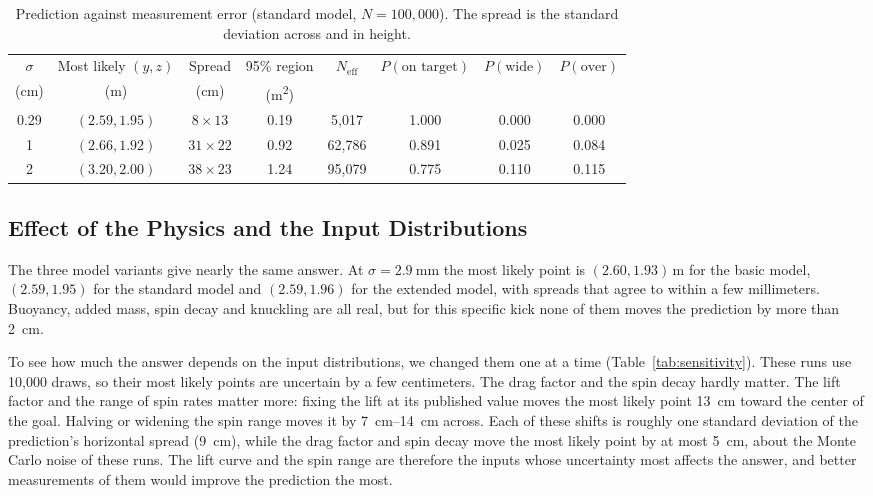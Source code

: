 \documentclass[10pt,a4paper]{article}
\begin{document}
\begin{table}[H]
  \centering
  \caption{Prediction against measurement error (standard model,
    $N = 100{,}000$). The spread is the standard deviation across and in
    height.}
  \label{tab:sigma}
  \small
  \begin{tabular}{cccccccc}
    \toprule
    $\sigma$ & Most likely $(y, z)$ & Spread & 95\% region & $N_{\mathrm{eff}}$
      & $P(\text{on target})$ & $P(\text{wide})$ & $P(\text{over})$ \\
    (\si{\centi\metre}) & (\si{\metre}) & (\si{\centi\metre}) & (\si{\metre\squared}) & & & & \\
    \midrule
    0.29 & $(2.59, 1.95)$ & $8 \times 13$  & 0.19 & 5{,}017  & 1.000 & 0.000 & 0.000 \\
    1    & $(2.66, 1.92)$ & $31 \times 22$ & 0.92 & 62{,}786 & 0.891 & 0.025 & 0.084 \\
    2    & $(3.20, 2.00)$ & $38 \times 23$ & 1.24 & 95{,}079 & 0.775 & 0.110 & 0.115 \\
    \bottomrule
  \end{tabular}
\end{table}

\subsection{Effect of the Physics and the Input Distributions}
\label{sec:sensitivity}

The three model variants give nearly the same answer. At
$\sigma = \SI{2.9}{\milli\metre}$ the most likely point is
$(2.60, 1.93)$\,\si{\metre} for the basic model, $(2.59, 1.95)$ for the
standard model and $(2.59, 1.96)$ for the extended model, with spreads that
agree to within a few millimeters. Buoyancy, added mass, spin decay and
knuckling are all real, but for this specific kick none of them moves the prediction
by more than \SI{2}{\centi\metre}.

To see how much the answer depends on the input distributions, we changed
them one at a time (Table~\ref{tab:sensitivity}). These runs use 10{,}000
draws, so their most likely points are uncertain by a few centimeters. The
drag factor and the spin decay hardly matter. The lift factor and the range
of spin rates matter more: fixing the lift at its published value moves the
most likely point \SI{13}{\centi\metre} toward the center of the goal.
Halving or widening the spin range moves it by
\SIrange{7}{14}{\centi\metre} across. Each of these shifts is roughly one
standard deviation of the prediction's horizontal spread (\SI{9}{\centi\metre}),
while the drag factor and spin decay move the most likely point by at most
\SI{5}{\centi\metre}, about the Monte Carlo noise of these runs. The lift
curve and the spin range are therefore the inputs whose uncertainty most
affects the answer, and better measurements of them would improve the
prediction the most.
\end{document}
